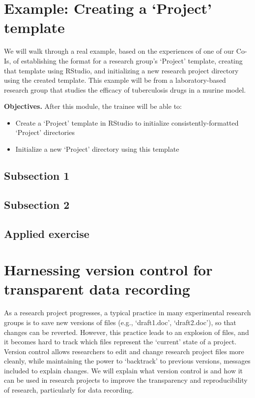 \documentclass[]{tufte-book}
\providecommand{\tightlist}{%
  \setlength{\itemsep}{0pt}\setlength{\parskip}{0pt}}
\begin{document}
\hypertarget{example-creating-a-project-template}{%
\section{Example: Creating a `Project' template}\label{example-creating-a-project-template}}

We will walk through a real example, based on the experiences of one of our
Co-Is, of establishing the format for a research group's `Project' template,
creating that template using RStudio, and initializing a new research project
directory using the created template. This example will be from a
laboratory-based research group that studies the efficacy of tuberculosis drugs
in a murine model.

\textbf{Objectives.} After this module, the trainee will be able to:

\begin{itemize}
\tightlist
\item
  Create a `Project' template in RStudio to initialize consistently-formatted
  `Project' directories
\item
  Initialize a new `Project' directory using this template
\end{itemize}

\hypertarget{subsection-1}{%
\subsection{Subsection 1}\label{subsection-1}}

\hypertarget{subsection-2}{%
\subsection{Subsection 2}\label{subsection-2}}

\hypertarget{applied-exercise}{%
\subsection{Applied exercise}\label{applied-exercise}}

\hypertarget{harnessing-version-control-for-transparent-data-recording}{%
\section{Harnessing version control for transparent data recording}\label{harnessing-version-control-for-transparent-data-recording}}

As a research project progresses, a typical practice in many experimental
research groups is to save new versions of files (e.g., `draft1.doc',
`draft2.doc'), so that changes can be reverted. However, this practice leads to
an explosion of files, and it becomes hard to track which files represent the
`current' state of a project. Version control allows researchers to edit and
change research project files more cleanly, while maintaining the power to
`backtrack' to previous versions, messages included to explain changes. We will
explain what version control is and how it can be used in research projects to
improve the transparency and reproducibility of research, particularly for data
recording.
\end{document}

